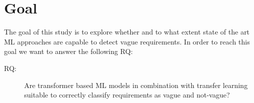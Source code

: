 \section{Goal}
\label{chp:study:sec:goal}
The goal of this study is to explore whether and to what extent state of the art \ac{ML} approaches are capable to detect vague requirements.
In order to reach this goal we want to answer the following \ac{RQ}:

\begin{description}
    \item[\Ac{RQ}:] Are transformer based \ac{ML} models in combination with transfer learning suitable to correctly classify requirements as vague and not-vague?
\end{description}
